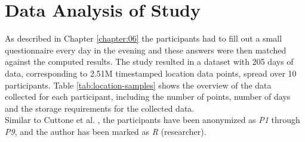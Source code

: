 \section{Data Analysis of Study}
As described in Chapter \ref{chapter:06} the participants had to fill out a small questionnaire every day in the evening and these answers were then matched against the computed results. The study resulted in a dataset with 205 days of data, corresponding to 2.51M timestamped location data points, spread over 10 participants. Table \ref{tab:location-samples} shows the overview of the data collected for each participant, including the number of points, number of days and the storage requirements for the collected data.\\

Similar to Cuttone et al. \cite{sparse-location-2014}, the participants have been anonymized as \textit{P1} through \textit{P9}, and the author has been marked as \textit{R} (researcher).\\

